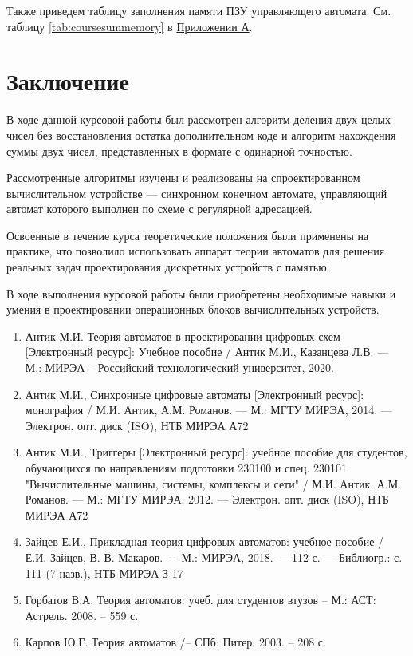 \documentclass[a4paper,14pt]{extarticle}
\begin{document}
Также приведем таблицу заполнения памяти ПЗУ управляющего автомата. См. таблицу \ref{tab:coursesummemory} в \hyperref[tam]{Приложении А}.

\section{Заключение}
В ходе данной курсовой работы был рассмотрен алгоритм деления двух целых чисел без восстановления остатка дополнительном коде и алгоритм нахождения суммы двух чисел, представленных в формате с одинарной точностью. 

Рассмотренные алгоритмы изучены и реализованы на спроектированном вычислительном устройстве --- синхронном конечном автомате, управляющий автомат которого выполнен по схеме с регулярной адресацией.

Освоенные в течение курса теоретические положения были применены на практике, что позволило использовать аппарат теории автоматов для решения реальных задач проектирования дискретных устройств с памятью. 

В ходе выполнения курсовой работы были приобретены необходимые навыки и умения в проектировании операционных блоков вычислительных устройств.


\label{biblio}
\begin{enumerate}
	\item Антик М.И. Теория автоматов в проектировании цифровых схем
	[Электронный ресурс]: Учебное пособие / Антик М.И., Казанцева
	Л.В. — М.: МИРЭА – Российский технологический университет,
	2020.
	\item Антик М.И., Синхронные цифровые автоматы [Электронный ресурс]:
	монография / М.И. Антик, А.М. Романов. — М.: МГТУ МИРЭА,
	2014. — Электрон. опт. диск (ISO), НТБ МИРЭА А72
	\item Антик М.И., Триггеры [Электронный ресурс]: учебное пособие для
	студентов, обучающихся по направлениям подготовки 230100 и спец.
	230101 "Вычислительные машины, системы, комплексы и сети" /
	М.И. Антик, А.М. Романов. — М.: МГТУ МИРЭА, 2012. — Электрон.
	опт. диск (ISO), НТБ МИРЭА А72
	\item Зайцев Е.И., Прикладная теория цифровых автоматов: учебное пособие / Е.И. Зайцев, В. В. Макаров. — М.: МИРЭА, 2018. — 112 с. —
	Библиогр.: с. 111 (7 назв.), НТБ МИРЭА З-17
	\item Горбатов В.А. Теория автоматов: учеб. для студентов втузов – М.:
	АСТ: Астрель. 2008. – 559 с.
	\item  Карпов Ю.Г. Теория автоматов /– СПб: Питер. 2003. – 208 с.
\end{enumerate}
\end{document}
